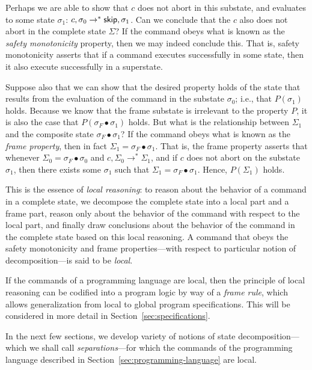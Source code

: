 \documentclass[11pt]{article}
\begin{document}
Perhaps we are able to show that $c$ does not abort in this substate, and evaluates to some state $\sigma_1$: $c,\sigma_0 \rightarrow^\ast \operatorname{\mathsf{skip}},\sigma_1$. Can we conclude that the $c$ also does not abort in the complete state $\Sigma$? If the command obeys what is known as the \emph{safety monotonicity} property, then we may indeed conclude this. That is, safety monotonicity asserts that if a command executes successfully in some state, then it also execute successfully in a superstate.  

Suppose also that we can show that the desired property holds of the state that results from the evaluation of the command in the substate $\sigma_0$; i.e., that $P(\sigma_1)$ holds. Because we know that the frame substate is irrelevant to the property $P$, it is also the case that $P(\sigma_F \bullet \sigma_1)$ holds. But what is the relationship between $\Sigma_1$ and the composite state $\sigma_F \bullet \sigma_1$? If the command obeys what is known as the \emph{frame property}, then in fact $\Sigma_1 = \sigma_F \bullet \sigma_1$. That is, the frame property asserts that whenever $\Sigma_0 = \sigma_F \bullet \sigma_0$ and $c,\Sigma_0 \rightarrow^\ast \Sigma_1$, and if $c$ does not abort on the substate $\sigma_1$, then there exists some $\sigma_1$ such that $\Sigma_1 = \sigma_F \bullet \sigma_1$. Hence, $P(\Sigma_1)$ holds. 

This is the essence of \emph{local reasoning}: to reason about the behavior of a command in a complete state, we decompose the complete state into a local part and a frame part, reason only about the behavior of the command with respect to the local part, and finally draw conclusions about the behavior of the command in the complete state based on this local reasoning. A command that obeys the safety monotonicity and frame properties---with respect to particular notion of decomposition---is said to be \emph{local}.

If the commands of a programming language are local, then the principle of local reasoning can be codified into a program logic by way of a \emph{frame rule}, which allows generalization from local to global program specifications. This will be considered in more detail in Section~\ref{sec:specifications}. 

In the next few sections, we develop variety of notions of state decomposition---which we shall call \emph{separations}---for which the commands of the programming language described in Section~\ref{sec:programming-language} are local. 
\end{document}
